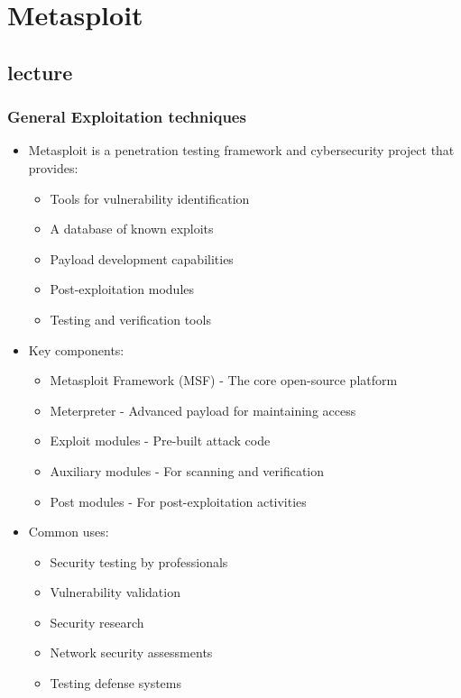 \chapter{Metasploit \cite{ivanbuetler}}
\newpage

\section{lecture}
\subsection{General Exploitation techniques}
\begin{itemize}
	\item Metasploit is a penetration testing framework and cybersecurity project that provides:
    \begin{itemize}
        \tightlist
		\item Tools for vulnerability identification
		\item A database of known exploits
		\item Payload development capabilities
		\item Post-exploitation modules
		\item Testing and verification tools
    \end{itemize}

	\item Key components:
    \begin{itemize}
        \tightlist
		\item Metasploit Framework (MSF) - The core open-source platform
		\item Meterpreter - Advanced payload for maintaining access
		\item Exploit modules - Pre-built attack code
		\item Auxiliary modules - For scanning and verification
		\item Post modules - For post-exploitation activities
    \end{itemize}

	\item Common uses:
    \begin{itemize}
        \tightlist
		\item Security testing by professionals
		\item Vulnerability validation
		\item Security research
		\item Network security assessments
		\item Testing defense systems
    \end{itemize}


\end{itemize}
